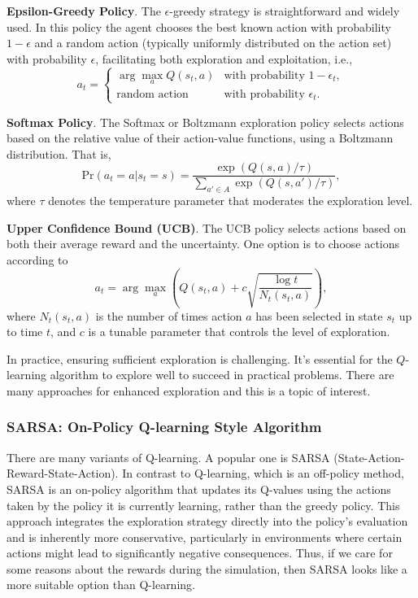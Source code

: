 \documentclass[letter,11pt]{article}
\begin{document}
\textbf{Epsilon-Greedy Policy}.
The \(\epsilon\)-greedy strategy is straightforward and widely used. In this policy the agent chooses the best known action with probability \(1 - \epsilon\) and a random action (typically uniformly distributed on the action set) with probability \(\epsilon\), facilitating both exploration and exploitation, i.e., 
\[
a_t = 
\begin{cases} 
\arg\max_a Q(s_t, a) & \text{with probability } 1 - \epsilon_{t}, \\
\text{random action} & \text{with probability } \epsilon_{t}.
\end{cases}
\]

\textbf{Softmax Policy}.
The Softmax or Boltzmann exploration policy selects actions based on the relative value of their action-value functions, using a Boltzmann distribution. That is, 
\[
\text{Pr}(a_t = a | s_t = s) = \frac{\exp \left ( Q(s, a)/\tau  \right ) }{\sum_{a' \in A} \exp \left ( Q(s, a')/\tau \right ) },
\]
where \(\tau\) denotes the temperature parameter that moderates the exploration level.

\textbf{Upper Confidence Bound (UCB)}. 
The UCB policy selects actions based on both their average reward and the uncertainty. One option is to choose actions according to 
\[ a_t = \arg\max_a \left( Q(s_t, a) + c \sqrt{\frac{\log t}{N_t(s_t, a)}} \right),
\]
where \(N_t(s_t, a)\) is the number of times action \(a\) has been selected in state \(s_t\) up to time \(t\), and \(c\) is a tunable parameter that controls the level of exploration.


In practice, ensuring sufficient exploration is challenging. It's essential for the $Q$-learning algorithm to explore well to succeed in practical problems. There are many approaches for enhanced exploration and this is a topic of interest.


\subsubsection{SARSA: On-Policy Q-learning Style Algorithm}

There are many variants of Q-learning. A popular one is SARSA (State-Action-Reward-State-Action). 
In contrast to Q-learning, which is an off-policy method, SARSA is an on-policy algorithm that updates its Q-values using the actions taken by the policy it is currently learning, rather than the greedy policy. This approach integrates the exploration strategy directly into the policy's evaluation and is inherently more conservative, particularly in environments where certain actions might lead to significantly negative consequences. Thus, if we care for some reasons about the rewards during the simulation, then SARSA looks like a more suitable option than Q-learning. 
\end{document}
